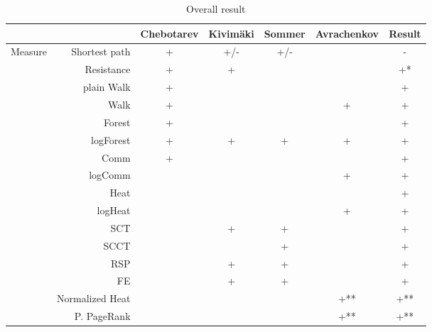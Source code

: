 \documentclass{article}
\begin{document}
\begin{table}[H]
\centering
\caption{Overall result}
\label{my-label}
\begin{tabular}{rr|cccc|c}
                &                          & Chebotarev & Kivim{\"a}ki & Sommer & Avrachenkov & Result \\
                \hline
\multirow{18}{*}{Measure} & Shortest path  & +          & \cellcolor{red!25} +/- & \cellcolor{red!25} +/- & & \cellcolor{red!25} - \\
                & Resistance               & +          & +        &        &             & \cellcolor{yellow!25} +* \\
                & plain Walk               & +          &          &        &             & +      \\
                & Walk                     & +          &          &        & +           & +      \\
                & Forest                   & +          &          &        &             & +      \\
                & logForest                & +          & +        & +      & +           & +      \\
                & Comm                     & +          &          &        &             & +      \\
                & logComm                  &            &          &        & +           & +      \\
                & Heat                     &            &          &        &             & \cellcolor{yellow!25} + \\
                & logHeat                  &            &          &        & +           & +      \\
                & SCT                      &            & +        & +      &             & +      \\
                & SCCT                     &            &          & +      &             & +      \\
                & RSP                      &            & +        & +      &             & +      \\
                & FE                       &            & +        & +      &             & +      \\
                & Normalized Heat          &            &          &        & +**         & \cellcolor{yellow!25} +** \\
                & P. PageRank              &            &          &        & +**         & \cellcolor{yellow!25} +** \\

\end{tabular}
\end{table}
\end{document}

